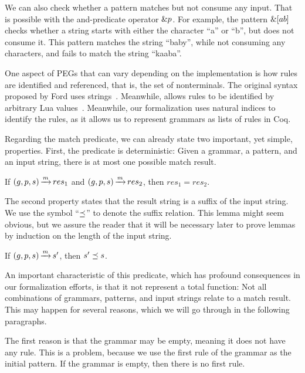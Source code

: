 We can also check whether a pattern matches
but not consume any input.
That is possible with the and-predicate operator $\&p$.
For example,
the pattern $\&[ab]$
checks whether a string
starts with either the character ``a'' or ``b'',
but does not consume it.
This pattern matches the string ``baby'',
while not consuming any characters,
and fails to match the string ``kaaba''.

One aspect of PEGs that can vary
depending on the implementation
is how rules are identified and referenced,
that is, the set of nonterminals.
The original syntax proposed by Ford
uses strings~\cite{ford_parsing_2004}.
Meanwhile,
\lpeg{} allows rules to be identified 
by arbitrary Lua values~\cite{ierusalimschy_lpeg_2024}.
Meanwhile, our formalization uses natural indices
to identify the rules,
as it allows us to represent
grammars as lists of rules in Coq.

Regarding the match predicate,
we can already state two important,
yet simple, properties.
First, the predicate is deterministic:
Given a grammar, a pattern, and an input string,
there is at most one possible match result.

\begin{lemma}%
    If ${(g,p,s) \operatorname{\xrightarrow{\mathit{m}}} res_1}$
    and ${(g,p,s) \operatorname{\xrightarrow{\mathit{m}}} res_2}$,
    then ${res_1 = res_2}$.
    \label{lemma:match-determinism}
\end{lemma}

The second property states that the result string
is a suffix of the input string.
We use the symbol ``${\preceq}$''
to denote the suffix relation.
This lemma might seem obvious,
but we assure the reader that it will be necessary later
to prove lemmas by induction on the length of the input string.

\begin{lemma}%
    If ${(g,p,s) \operatorname{\xrightarrow{\mathit{m}}} s'}$,
    then ${s' \preceq s}$.
    \label{lemma:match-suffix}
\end{lemma}

An important characteristic of this predicate,
which has profound consequences in our formalization efforts,
is that it not represent a total function:
Not all combinations of
grammars, patterns, and input strings
relate to a match result.
This may happen for several reasons,
which we will go through
in the following paragraphs.

The first reason is that
the grammar may be empty,
meaning it does not have any rule.
This is a problem,
because we use the first rule of the grammar
as the initial pattern.
If the grammar is empty,
then there is no first rule.

